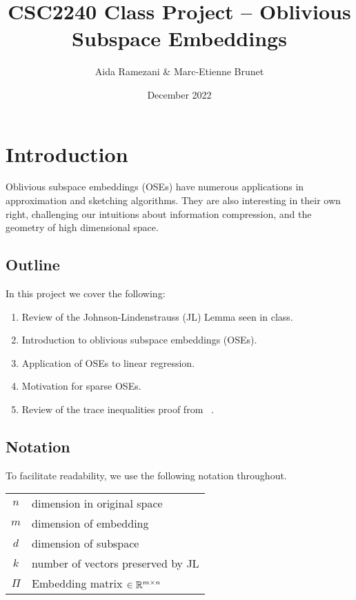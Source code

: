 \documentclass[11pt]{article}
\title{CSC2240 Class Project -- Oblivious Subspace Embeddings}
\author{Aida Ramezani \& Marc-Etienne Brunet}
\date{December 2022}
\begin{document}
\setlength\parindent{0pt}
\setlength\parskip{0.5em}

\maketitle

\section{Introduction}
Oblivious subspace embeddings (OSEs) have numerous applications in approximation and sketching algorithms.
They are also interesting in their own right,
challenging our intuitions about information compression, 
and the geometry of high dimensional space.

\subsection{Outline}
In this project we cover the following:

\begin{enumerate}
    \item Review of the Johnson-Lindenstrauss (JL) Lemma seen in class. 
    \item Introduction to oblivious subspace embeddings (OSEs).
    \item Application of OSEs to linear regression.
    \item Motivation for sparse OSEs.
    \item Review of the trace inequalities proof from ~\cite{cohen2016nearly}.
\end{enumerate}

\subsection{Notation}
To facilitate readability, we use the following notation throughout. 
\begin{table}[]
    \centering
    \begin{tabular}{c|l}
        $n$ & dimension in original space \\
        $m$ & dimension of embedding \\
        $d$ & dimension of subspace \\
        $k$ & number of vectors preserved by JL \\
        $\Pi$ & Embedding matrix $\in \mathbb R^{m \times n}$
    \end{tabular}
    \label{tab:my_label}
\end{table}
\end{document}
